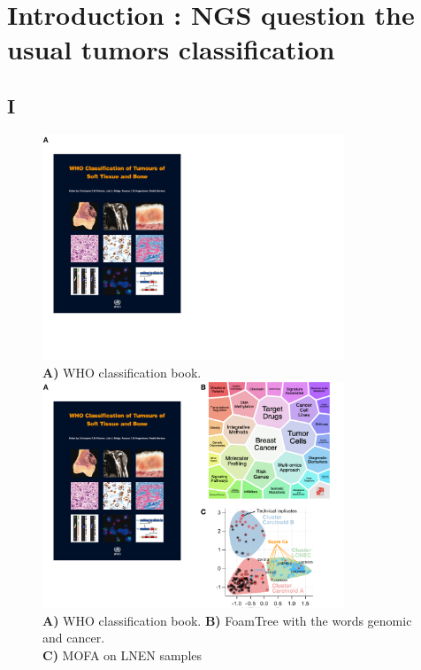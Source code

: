 \documentclass[compress]{beamer}
\begin{document}
\section{\vspace*{2mm}Introduction : NGS question the usual tumors classification} \subsection{I}
\begin{frame}

\vspace*{-0.75cm}
\center
\begin{figure}
\centering
    \begin{overprint}
		\center\includegraphics[height=6.75cm]{figures/intro/intro_context_1_2.pdf}\\
	\tiny{\textbf{A) } WHO classification book.}
		\onslide<2>\center\includegraphics[height=6.75cm]{figures/intro/intro_context_2_2.pdf}\\
			\tiny{	\textbf{A) } WHO classification book. \textbf{B) } FoamTree with the words genomic and cancer. \\
			\textbf{C) } MOFA on LNEN samples \cite{alcala2019integrative}} 
	\end{overprint}
\end{figure}

  \begin{flushright}
\color{IARCdblue}{  \scriptsize{\insertframenumber / \inserttotalframenumber}} \hspace*{2mm}
  \end{flushright}

\end{frame}
\end{document}
